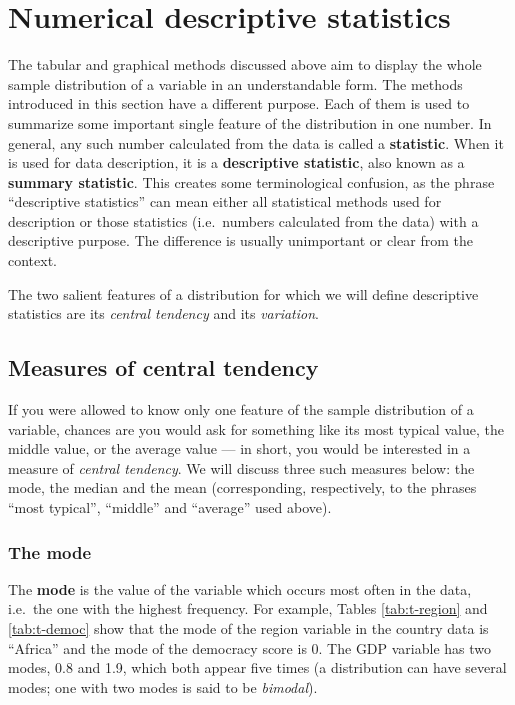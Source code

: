 \documentclass[11pt,a4paper,openany]{book}
\begin{document}
\section{Numerical descriptive statistics}\label{s-descr1-nums}

The tabular and graphical methods discussed above aim to display the
whole sample distribution of a variable in an understandable form. The
methods introduced in this section have a different purpose. Each of
them is used to summarize some important single feature of the
distribution in one number. In general, any such number calculated from
the data is called a \textbf{statistic}. When it is used for data
description, it is a \textbf{descriptive statistic}, also known as a
\textbf{summary statistic}. This creates some terminological confusion,
as the phrase ``descriptive statistics'' can mean either all statistical
methods used for description or those statistics (i.e.~numbers
calculated from the data) with a descriptive purpose. The difference is
usually unimportant or clear from the context.

The two salient features of a distribution for which we will define
descriptive statistics are its \emph{central tendency} and its
\emph{variation}.

\subsection{Measures of central tendency}\label{ss-descr1-nums-central}

If you were allowed to know only one feature of the sample distribution
of a variable, chances are you would ask for something like its most
typical value, the middle value, or the average value --- in short, you
would be interested in a measure of \emph{central tendency}. We will
discuss three such measures below: the mode, the median and the mean
(corresponding, respectively, to the phrases ``most typical'',
``middle'' and ``average'' used above).

\subsubsection*{The mode}\label{the-mode}

The \textbf{mode} is the value of the variable which occurs most often
in the data, i.e.~the one with the highest frequency. For example,
Tables \ref{tab:t-region} and \ref{tab:t-democ} show that the mode of
the region variable in the country data is ``Africa'' and the mode of
the democracy score is 0. The GDP variable has two modes, 0.8 and 1.9,
which both appear five times (a distribution can have several modes; one
with two modes is said to be \emph{bimodal}).
\end{document}
